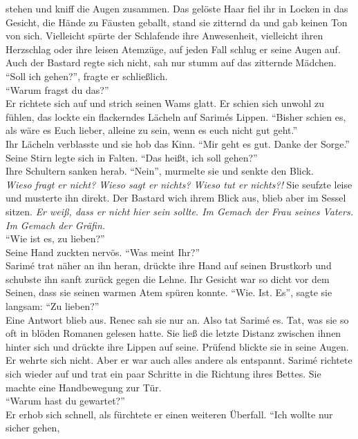 stehen und kniff die Augen zusammen. Das gelöste Haar fiel ihr in Locken in das Gesicht, die Hände 
zu Fäusten geballt, stand sie zitternd da und gab keinen Ton von sich. Vielleicht spürte der 
Schlafende ihre Anwesenheit, vielleicht ihren Herzschlag oder ihre leisen Atemzüge, auf jeden Fall 
schlug er seine Augen auf. Auch der Bastard regte sich nicht, sah nur stumm auf das zitternde 
Mädchen. \\
``Soll ich gehen?'', fragte er schließlich.\\
``Warum fragst du das?''\\
Er richtete sich auf und strich seinen Wams glatt. Er schien sich unwohl zu fühlen, das lockte ein 
flackerndes Lächeln auf Sarimés Lippen. ``Bisher schien es, als wäre es Euch lieber, alleine zu 
sein, wenn es euch nicht gut geht.''\\
Ihr Lächeln verblasste und sie hob das Kinn. ``Mir geht es gut. Danke der Sorge.''\\
Seine Stirn legte sich in Falten. ``Das heißt, ich soll gehen?''\\
Ihre Schultern sanken herab. ``Nein'', murmelte sie und senkte den Blick.\\
\textit{Wieso fragt er nicht? Wieso sagt er nichts? Wieso tut er nichts?!} Sie seufzte leise und 
musterte ihn direkt. Der Bastard wich ihrem Blick aus, blieb aber im Sessel sitzen. \textit{Er 
weiß, dass er nicht hier sein sollte. Im Gemach der Frau seines Vaters. Im Gemach der Gräfin.}\\
``Wie ist es, zu lieben?''\\
Seine Hand zuckten nervös. ``Was meint Ihr?''\\
Sarimé trat näher an ihn heran, drückte ihre Hand auf seinen Brustkorb und schubste ihn sanft 
zurück gegen die Lehne. Ihr Gesicht war so dicht vor dem Seinen, dass sie seinen warmen Atem spüren 
konnte. ``Wie. Ist. Es'', sagte sie langsam: ``Zu lieben?''\\
Eine Antwort blieb aus. Renec sah sie nur an. Also tat Sarimé es. Tat, was sie so oft in blöden 
Romanen gelesen hatte. Sie ließ die letzte Distanz zwischen ihnen hinter sich und drückte ihre 
Lippen auf seine. Prüfend blickte sie in seine Augen. Er wehrte sich nicht. Aber er war auch alles 
andere als entspannt. Sarimé richtete sich wieder auf und trat ein paar Schritte in die Richtung 
ihres Bettes. Sie machte eine Handbewegung zur Tür. \\
``Warum hast du gewartet?''\\
Er erhob sich schnell, als fürchtete er einen weiteren Überfall. ``Ich wollte nur sicher gehen, 
